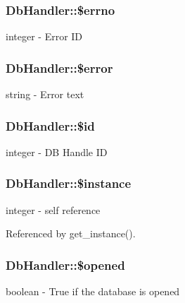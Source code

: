 \subsubsection[{\$errno}]{\setlength{\rightskip}{0pt plus 5cm}DbHandler::\$errno}\label{classDbHandler_af6e9f493be56617cb533763bb2a0e85a}
integer -\/ Error ID 
\subsubsection[{\$error}]{\setlength{\rightskip}{0pt plus 5cm}DbHandler::\$error}\label{classDbHandler_ade79e11156abbfc180864beb5b9df377}
string -\/ Error text 
\subsubsection[{\$id}]{\setlength{\rightskip}{0pt plus 5cm}DbHandler::\$id}\label{classDbHandler_ad38e1c3312815c8ad4093957881092ff}
integer -\/ DB Handle ID 
\subsubsection[{\$instance}]{\setlength{\rightskip}{0pt plus 5cm}DbHandler::\$instance}\label{classDbHandler_a0859a862eac3e8ba14c6d04de0396710}
integer -\/ self reference 

Referenced by get\_\-instance().

\subsubsection[{\$opened}]{\setlength{\rightskip}{0pt plus 5cm}DbHandler::\$opened}\label{classDbHandler_a71e36ffbff0d157b1d91dc000bc6f821}
boolean -\/ True if the database is opened 
